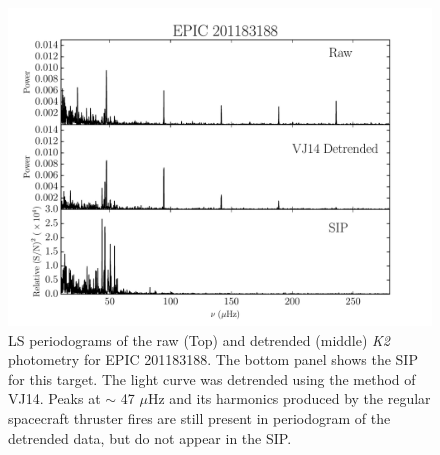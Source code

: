 \documentclass[useAMS, usenatbib, preprint, 12pt]{aastex}
\begin{document}
\begin{figure}
\begin{center}
\includegraphics[width=6in, clip=true]{rawvbg_201183188.pdf}
\caption{LS periodograms of the raw (Top) and detrended (middle) {\it K2}
	 photometry for EPIC 201183188.
	 The bottom panel shows the SIP for this target. The light curve was
 	 detrended using the method of VJ14.
	 Peaks at $\sim$ 47 $\mu$Hz and its harmonics produced by the regular
	 spacecraft thruster fires are still present in periodogram of the
	 detrended data, but do not appear in the SIP.}
\label{fig:raw}
\end{center}
\end{figure}
\end{document}
